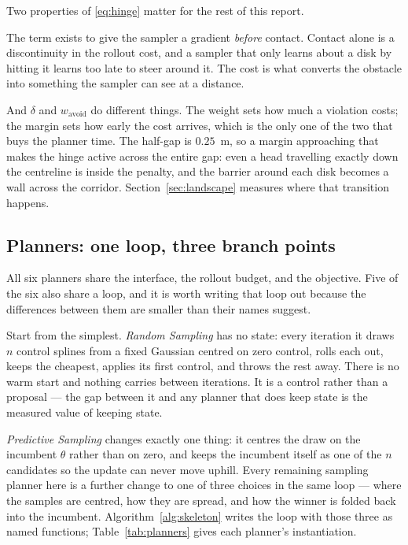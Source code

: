 \documentclass[conference]{IEEEtran}
\begin{document}
Two properties of \eqref{eq:hinge} matter for the rest of this report.

The term exists to give the sampler a gradient \emph{before} contact. Contact
alone is a discontinuity in the rollout cost, and a sampler that only learns
about a disk by hitting it learns too late to steer around it. The cost is what
converts the obstacle into something the sampler can see at a distance.

And $\delta$ and $w_{\text{avoid}}$ do different things. The weight sets how much
a violation costs; the margin sets how early the cost arrives, which is the only
one of the two that buys the planner time. The half-gap is $0.25$~m, so a margin
approaching that makes the hinge active across the entire gap: even a head
travelling exactly down the centreline is inside the penalty, and the barrier
around each disk becomes a wall across the corridor. Section~\ref{sec:landscape}
measures where that transition happens.

\subsection{Planners: one loop, three branch points}
\label{sec:planners}

All six planners share the interface, the rollout budget, and the objective.
Five of the six also share a loop, and it is worth writing that loop out
because the differences between them are smaller than their names suggest.

Start from the simplest. \emph{Random Sampling} has no state: every iteration it
draws $n$ control splines from a fixed Gaussian centred on zero control, rolls
each out, keeps the cheapest, applies its first control, and throws the rest
away. There is no warm start and nothing carries between iterations. It is a
control rather than a proposal --- the gap between it and any planner that does
keep state is the measured value of keeping state.

\emph{Predictive Sampling} \cite{mjpc} changes exactly one thing: it centres the
draw on the incumbent $\theta$ rather than on zero, and keeps the incumbent
itself as one of the $n$ candidates so the update can never move uphill. Every
remaining sampling planner here is a further change to one of three choices in
the same loop --- where the samples are centred, how they are spread, and how
the winner is folded back into the incumbent. Algorithm~\ref{alg:skeleton}
writes the loop with those three as named functions; Table~\ref{tab:planners}
gives each planner's instantiation.
\end{document}
